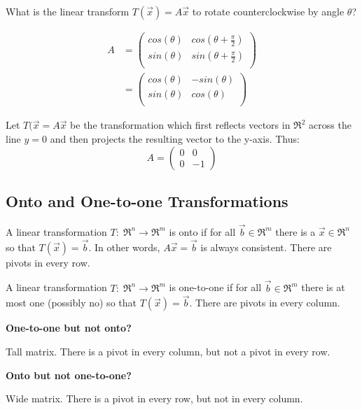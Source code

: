 \noindent
\newline
What is the linear transform \(T(\Vec{x})=A\Vec{x}\) to rotate counterclockwise by angle \(\theta\)?

\begin{align}
    A &= \begin{pmatrix}
        cos(\theta) & cos(\theta + \frac{\pi}{2}) \\
        sin(\theta) & sin(\theta + \frac{\pi}{2}) \\
    \end{pmatrix} \\
    &= \begin{pmatrix}
        cos(\theta) & -sin(\theta) \\
        sin(\theta) & cos(\theta) \\
    \end{pmatrix}
\end{align}

\noindent
\newline
Let \(T(\Vec{x}=A\Vec{x}\) be the transformation which first reflects vectors in \(\Re^2\) across the line \(y=0\) and then projects the resulting vector to the y-axis. Thus:
\begin{equation}
    A = \begin{pmatrix}
        0 & 0 \\
        0 & -1
    \end{pmatrix}
\end{equation}

\subsection{Onto and One-to-one Transformations}
\begin{definition}
    A linear transformation \(T: \; \Re^n \rightarrow \Re^m\) is onto if for all \(\Vec{b} \in \Re^m\) there is a \(\Vec{x} \in \Re^n\) so that \(T(\Vec{x})=\Vec{b}\). In other words, \(A\Vec{x}=\Vec{b}\) is always consistent. There are pivots in every row.
\end{definition}

\begin{definition}
    A linear transformation \(T: \; \Re^n \rightarrow \Re^m\) is one-to-one if for all \(\Vec{b} \in \Re^m\) there is at most one (possibly no) so that \(T(\Vec{x})=\Vec{b}\). There are pivots in every column.
\end{definition}

\noindent
\newline
\textbf{One-to-one but not onto?}

\noindent
Tall matrix. There is a pivot in every column, but not a pivot in every row.

\noindent
\newline
\textbf{Onto but not one-to-one?}

\noindent
Wide matrix. There is a pivot in every row, but not in every column.
